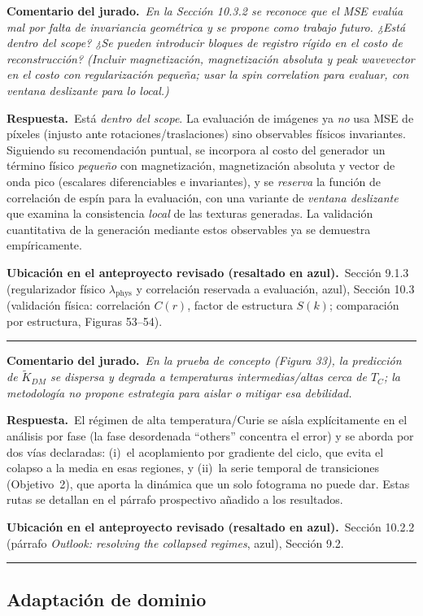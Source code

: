 \documentclass[11pt]{article}
\newcommand{\comentario}[1]{\par\smallskip\noindent\textbf{\color{jgris}Comentario del jurado.}\ \textit{#1}\par}
\newcommand{\respuesta}[1]{\par\smallskip\noindent\textbf{\color{jverde}Respuesta.}\ #1\par}
\newcommand{\ubic}[1]{\par\smallskip\noindent\textbf{\color{jazul}Ubicación en el anteproyecto revisado (resaltado en azul).}\ #1\par\medskip\hrule\medskip}
\begin{document}
\comentario{En la Sección 10.3.2 se reconoce que el MSE evalúa mal por falta de invariancia geométrica y se propone como trabajo futuro. ¿Está dentro del \emph{scope}? ¿Se pueden introducir bloques de registro rígido en el costo de reconstrucción? (Incluir magnetización, magnetización absoluta y \emph{peak wavevector} en el costo con regularización pequeña; usar la \emph{spin correlation} para evaluar, con ventana deslizante para lo local.)}
\respuesta{Está \emph{dentro del scope}. La evaluación de imágenes ya \emph{no} usa MSE de píxeles (injusto ante rotaciones/traslaciones) sino observables físicos invariantes. Siguiendo su recomendación puntual, se incorpora al costo del generador un término físico \emph{pequeño} con magnetización, magnetización absoluta y vector de onda pico (escalares diferenciables e invariantes), y se \emph{reserva} la función de correlación de espín para la evaluación, con una variante de \emph{ventana deslizante} que examina la consistencia \emph{local} de las texturas generadas. La validación cuantitativa de la generación mediante estos observables ya se demuestra empíricamente.}
\ubic{Sección 9.1.3 (regularizador físico $\lambda_{\mathrm{phys}}$ y correlación reservada a evaluación, azul), Sección 10.3 (validación física: correlación $C(r)$, factor de estructura $S(k)$; comparación por estructura, Figuras 53--54).}

\comentario{En la prueba de concepto (Figura 33), la predicción de $\tilde{K}_{DM}$ se dispersa y degrada a temperaturas intermedias/altas cerca de $T_C$; la metodología no propone estrategia para aislar o mitigar esa debilidad.}
\respuesta{El régimen de alta temperatura/Curie se aísla explícitamente en el análisis por fase (la fase desordenada ``others'' concentra el error) y se aborda por dos vías declaradas: (i)~el acoplamiento por gradiente del ciclo, que evita el colapso a la media en esas regiones, y (ii)~la serie temporal de transiciones (Objetivo~2), que aporta la dinámica que un solo fotograma no puede dar. Estas rutas se detallan en el párrafo prospectivo añadido a los resultados.}
\ubic{Sección 10.2.2 (párrafo \emph{Outlook: resolving the collapsed regimes}, azul), Sección 9.2.}

\subsection{Adaptación de dominio}
\end{document}
